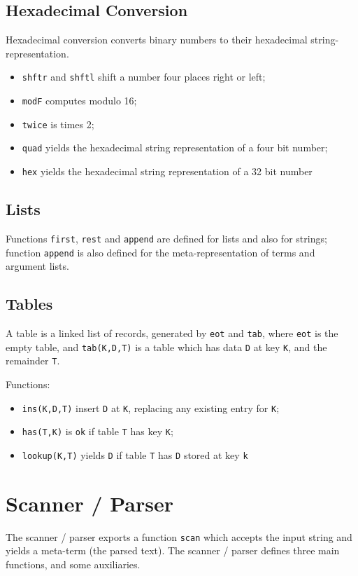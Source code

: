\documentclass[11pt,twoside]{memoir}
\def\T{\texttt}
\begin{document}
\subsection{Hexadecimal Conversion}

Hexadecimal conversion converts binary numbers to their hexadecimal string-representation.

\begin{itemize}
	\item \T{shftr} and \T{shftl} shift a number four places right or left;
	\item \T{modF} computes modulo 16;
	\item \T{twice} is times 2;
	\item \T{quad} yields the hexadecimal string representation of a four bit number;
	\item \T{hex} yields the hexadecimal string representation of a 32 bit number
\end{itemize}



\subsection{Lists}
Functions \T{first}, \T{rest} and \T{append} are defined for lists and also for strings; function \T{append} is also defined for the meta-representation of terms and argument lists.


\subsection{Tables}
A table is a linked list of records, generated by \T{eot} and \T{tab}, where \T{eot} is the empty table, and \T{tab(K,D,T)} is a table which has data \T{D} at key \T{K}, and the remainder \T{T}.


Functions:
\begin{itemize}
	\item \T{ins(K,D,T)} insert \T{D} at \T{K}, replacing any existing entry for \T{K};
	\item \T{has(T,K)} is \T{ok} if table \T{T} has key \T{K};
	\item \T{lookup(K,T)} yields \T{D} if table \T{T} has \T{D} stored at key \T{k}
\end{itemize}

\section{Scanner / Parser}
The scanner / parser exports a function \T{scan} which accepts the input string and yields a meta-term (the parsed text). The scanner / parser defines three main functions, and some auxiliaries.
\end{document}
